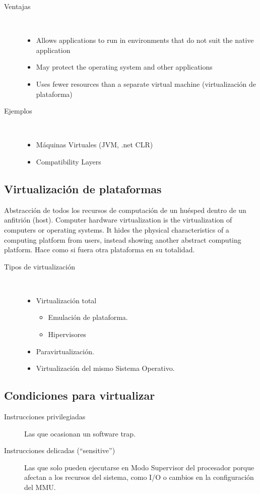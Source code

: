 \documentclass[a4paper, twoside]{article}
\begin{document}
\begin{description}
	\item[Ventajas] ~
	\begin{itemize}
		\item Allows applications to run in environments that do not suit the native application
		\item May protect the operating system and other applications
		\item Uses fewer resources than a separate virtual machine (virtualización de plataforma)
	\end{itemize}

	\item[Ejemplos] ~
	\begin{itemize}
		\item Máquinas Virtuales (JVM, .net CLR)
		\item Compatibility Layers
	\end{itemize}
\end{description}

\subsection{Virtualización de plataformas}
Abstracción de todos los recursos de computación de un huésped dentro de un anfitrión (host). Computer hardware virtualization is the virtualization of computers or operating systems. It hides the physical characteristics of a computing platform from users, instead showing another abstract computing platform. Hace como si fuera otra plataforma en su totalidad.

\begin{description}
	\item[Tipos de virtualización] ~
	\begin{itemize}
		\item Virtualización total
		\begin{itemize}
			\item Emulación de plataforma.
			\item Hipervisores
		\end{itemize}
		\item Paravirtualización.
		\item Virtualización del mismo Sistema Operativo.
	\end{itemize}
\end{description}

\subsection{Condiciones para virtualizar}
\begin{description}
	\item[Instrucciones privilegiadas] Las que ocasionan un software trap.
	\item[Instrucciones delicadas (``sensitive'')] Las que solo pueden ejecutarse en Modo Supervisor del procesador porque afectan a los recursos del sistema, como I/O o cambios en la configuración del MMU.
\end{description}
\end{document}
